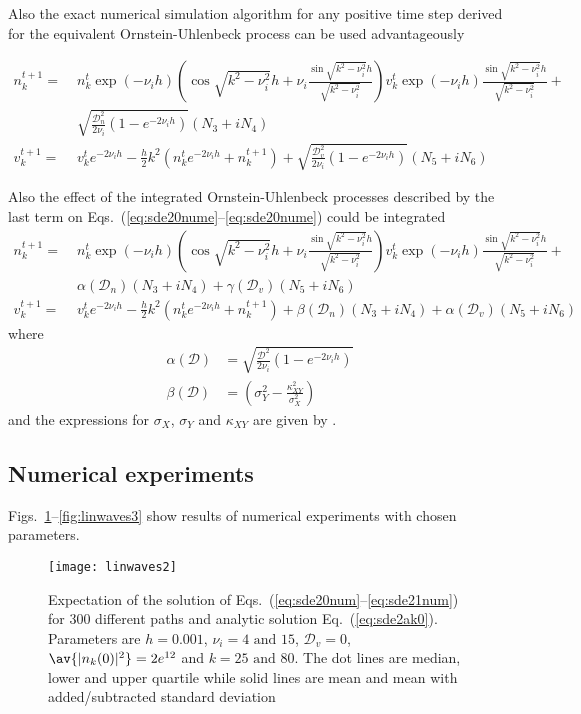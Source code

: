 \documentclass[10pt,a4paper]{article}
\newcommand{\eq}[1]{Eq.~(#1)}
\newcommand{\eqs}[1]{Eqs.~(#1)}
\newcommand{\figs}[1]{Figs.~#1}
\newcommand{\src}{\ensuremath{\mathcal{D}}}
\def\knui{\sqrt{k^2{-}\nu_i^2}}
\begin{document}
Also the exact numerical simulation algorithm for any positive
time step derived for the equivalent Ornstein-Uhlenbeck process \citep{gillespie:1996b} can be
used advantageously

\begin{align}
n_k^{t+1}=&\;n_k^t\exp(-\nu_ih)\left(\cos\knui h+
\nu_i\frac{\sin\knui h}{\knui}\right)
v_k^t\exp(-\nu_ih)\frac{\sin\knui h}{\knui}+\nonumber\\
&\;\sqrt{\frac{\src_n^2}{2\nu_i}(1-e^{-2\nu_ih})}\left(N_3+iN_4\right)
\label{eq:sde20nume}\\
v_k^{t+1}=&\;v_k^t e^{-2\nu_ih}-\frac{h}{2}k^2\left(n_k^t
e^{-2\nu_ih}+n_k^{t+1}\right)+
\sqrt{\frac{\src_v^2}{2\nu_i}(1-e^{-2\nu_ih})}\left(N_5+iN_6\right)
\label{eq:sde21nume}
\end{align}

Also the effect of the integrated Ornstein-Uhlenbeck processes described by the last term on
\eqs{\ref{eq:sde20nume}--\ref{eq:sde20nume}} could be integrated
\begin{align}
n_k^{t+1}=&\;n_k^t\exp(-\nu_ih)\left(\cos\knui h+
\nu_i\frac{\sin\knui h}{\knui}\right)
v_k^t\exp(-\nu_ih)\frac{\sin\knui h}{\knui}+\nonumber\\
&\;\alpha(\src_n)\left(N_3+iN_4\right) +\gamma(\src_v)\left(N_5+iN_6\right)
\label{eq:sde20nume2}\\
v_k^{t+1}=&\;v_k^t e^{-2\nu_ih}-\frac{h}{2}k^2\left(n_k^t
e^{-2\nu_ih}+n_k^{t+1}\right)+\beta(\src_n)\left(N_3+iN_4\right)+
\alpha(\src_v)\left(N_5+iN_6\right)
\label{eq:sde21nume2}
\end{align}
where 
\begin{align}
\alpha(\src) &= \sqrt{\frac{\src^2}{2\nu_i}(1-e^{-2\nu_ih})} \\
\beta(\src) &= \left(\sigma_Y^2-\frac{\kappa_{XY}^2}{\sigma_X^2}\right)
\end{align}
and the expressions for $\sigma_X$, $\sigma_Y$ and $\kappa_{XY}$ are given by
\cite{gillespie:1996b}.


\subsection{Numerical experiments}

\figs{\ref{fig:linwaves2}--\ref{fig:linwaves3}} show results of numerical
experiments with chosen parameters.

\begin{figure}[ht]
\centering\texttt{[image: linwaves2]}
\caption{Expectation of the solution of \eqs{\ref{eq:sde20num}--\ref{eq:sde21num}} 
for 300 different paths and analytic solution \eq{\ref{eq:sde2ak0}}.
Parameters are $h=0.001$, $\nu_i=4\mbox{ and }15$, $\src_v=0$, 
$\av{|n_k(0)|^2}=2e^{12}$  and $k=25\mbox{ and }80$. 
The dot lines are median, lower and upper quartile while solid lines are mean and mean with
added/subtracted standard deviation}
\label{fig:linwaves2}
\end{figure}
\end{document}
